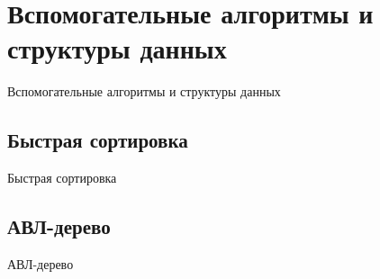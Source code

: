 \section{Вспомогательные алгоритмы и структуры данных}
Вспомогательные алгоритмы и структуры данных

\subsection{Быстрая сортировка}
Быстрая сортировка

\subsection{АВЛ-дерево}
АВЛ-дерево

\newpage
